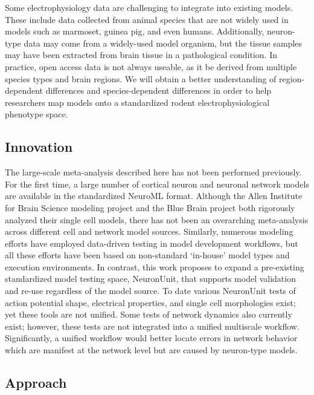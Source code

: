 Some electrophysiology data are challenging to integrate into existing models.
These include data collected from animal species that are not widely used in models such as marmoset, guinea pig, and even humans. 
Additionally, neuron-type data may come from a widely-used model organism, but the tissue samples may have been extracted from brain tissue in a pathological condition.
In practice, open access data is not always useable, as it be derived from multiple species types and brain regions. We will obtain a better understanding of region-dependent differences and species-dependent differences in order to help researchers map models onto a standardized rodent electrophysiological phenotype space.
\subsection{Innovation}
The large-scale meta-analysis described here has not been performed previously. For the first time, a large number of cortical neuron and neuronal network models are available in the standardized NeuroML format. Although the Allen Institute for Brain Science modeling project and the Blue Brain project both rigorously analyzed their single cell models, there has not been an overarching meta-analysis across different cell and network model sources. Similarly, numerous modeling efforts have employed data-driven testing in model development workflows, but all these efforts have been based on non-standard ‘in-house’ model types and execution environments. In contrast, this work proposes to expand a pre-existing standardized model testing space, NeuronUnit, that supports model validation and re-use regardless of the model source. To date various NeuronUnit tests of action potential shape, electrical properties, and single cell morphologies exist; yet these tools are not unified. Some tests of network dynamics also currently exist; however, these tests are not integrated into a unified multiscale workflow. Significantly, a unified workflow would better locate errors in network behavior which are manifest at the network level but are caused by neuron-type models. \newline
\newline

\subsection{Approach}

